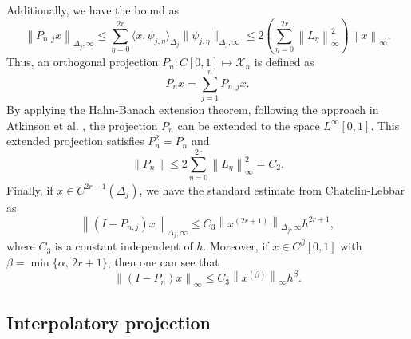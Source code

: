 \documentclass[pdflatex, sn-mathphys-num]{sn-jnl}%
\newcommand{\norm}[1]{\left\lVert #1\right\rVert}
\theoremstyle{thmstyleone}%
\theoremstyle{thmstyletwo}%
\theoremstyle{thmstylethree}%
\begin{document}
Additionally, we have the bound as
\[
\norm{P_{n,j} x}_{\Delta_j, \infty} \leq \sum_{\eta=0}^{2r} \langle x, \psi_{j,\eta} \rangle_{\Delta_j} \|\psi_{j,\eta}\|_{\Delta_j, \infty} \leq 2 \left( \sum_{\eta=0}^{2r} \norm{L_{\eta}}_{\infty}^2 \right) \norm{x}_{\infty}.
\]
Thus, an orthogonal projection \(P_n : C[0,1] \mapsto \mathcal{X}_n\) is defined as
\begin{equation} \label{Eq: 007}
	P_n x = \sum_{j=1}^{n} P_{n,j} x.
\end{equation}
By applying the Hahn-Banach extension theorem, following the approach in Atkinson et al. \cite{KEA-IG-IS}, the projection \(P_n\) can be extended to the space \(L^\infty[0,1]\). This extended projection satisfies \(P_n^2 = P_n\) and 
\begin{equation} \label{Eq: 008}
	\norm{P_n} \leq 2 \sum_{\eta=0}^{2r} \norm{L_{\eta}}_{\infty}^2 =C_2. 
\end{equation}
Finally, if \(x \in C^{2r+1}(\Delta_j)\), we have the standard estimate from Chatelin-Lebbar \cite{Cha-Leb2} as
\begin{equation} \label{Eq: 009}
	\norm{(I - P_{n,j}) x}_{\Delta_j, \infty} \leq C_3 \norm{x^{(2r+1)}}_{\Delta_j, \infty} h^{2r+1},
\end{equation}
where $C_3$ is a constant independent of $h$. Moreover, if $x \in C^{\beta}[0,1]$ with $\beta = \min\{\alpha,\, 2r+1\}$, then one can see that
\begin{equation} \label{Eq: 0010}
	\norm{(I - P_{n})x}_\infty \leq C_3 \norm{x^{(\beta)}}_\infty h^{\beta}.
\end{equation}

\subsection{Interpolatory projection}
\end{document}
